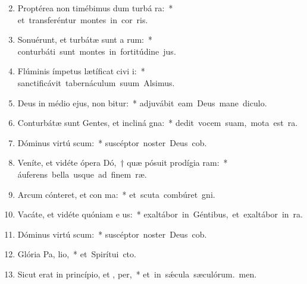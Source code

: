 \begin{flushleft}
\begin{enumerate}[leftmargin=*]
\setcounter{enumi}{1}

\item Proptérea non timébimus dum turbá ra:~* \mbox{et transferéntur montes in cor ris.}
\item Sonuérunt, et turbátæ sunt a rum:~* \mbox{conturbáti sunt montes in fortitúdine jus.}
\item Flúminis ímpetus lætíficat civi i:~* \mbox{sanctificávit tabernáculum suum Alsimus.}
\item Deus in médio ejus, non bitur:~* \mbox{adjuvábit eam Deus mane diculo.}
\item Conturbátæ sunt Gentes, et incliná  gna:~* \mbox{dedit vocem suam, mota est ra.}
\item Dóminus virtú scum:~* \mbox{suscéptor noster Deus cob.}
\item Veníte, et vidéte ópera Dó,~† quæ pósuit prodígia  ram:~* \mbox{áuferens bella usque ad finem ræ.}
\item Arcum cónteret, et con ma:~* \mbox{et scuta combúret gni.}
\item Vacáte, et vidéte quóniam e  us:~* \mbox{exaltábor in Géntibus, et exaltábor in ra.}
\item Dóminus virtú scum:~* \mbox{suscéptor noster Deus cob.}
\item Glória Pa,  lio,~* \mbox{et Spirítui cto.}
\item Sicut erat in princípio, et ,  per,~* \mbox{et in s\'{\ae}cula sæculórum. men.}


\end{enumerate}
\end{flushleft}

